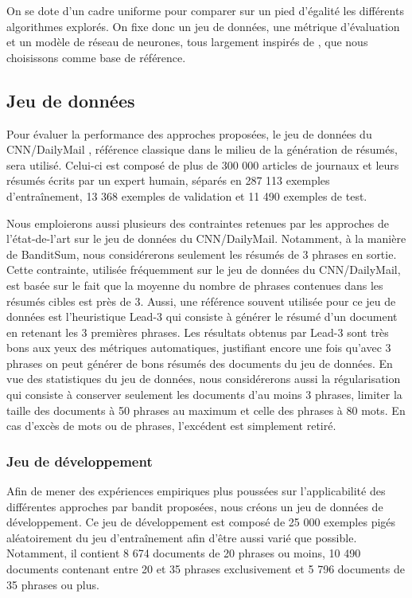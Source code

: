 On se dote d'un cadre uniforme pour comparer sur un pied d'égalité
les différents algorithmes explorés.
On fixe donc un jeu de données, une métrique d'évaluation 
et un modèle de réseau de neurones, tous largement inspirés
de \citet{dong2018banditsum}, que nous choisissons comme base 
de référence.


\subsection{Jeu de données}
\label{subsec:jeu_donnees}

Pour évaluer la performance des approches proposées, le jeu de données du
CNN/DailyMail \citep{hermann2015teaching}, référence classique dans le milieu
de la génération de résumés, sera utilisé.
Celui-ci est composé de plus de 300 000 articles de journaux et
leurs résumés écrits par un expert humain, séparés en 
287 113 exemples d'entraînement, 13 368 exemples de validation 
et 11 490 exemples de test.

Nous emploierons aussi plusieurs des contraintes retenues par les approches
de l'état-de-l'art sur le jeu de données du CNN/DailyMail.
Notamment, à la manière de BanditSum, nous considérerons seulement les résumés
de 3 phrases en sortie.
Cette contrainte, utilisée fréquemment sur le jeu de données du CNN/DailyMail,
est basée sur le fait que la moyenne du nombre de phrases contenues dans les résumés cibles
est près de 3.
Aussi, une référence souvent utilisée pour ce jeu de données est l'heuristique Lead-3 \citep{10.5555/3298483.3298681}
qui consiste à générer le résumé d'un document en retenant les 3 premières phrases.
Les résultats obtenus par Lead-3 sont très bons aux yeux des métriques automatiques,
justifiant encore une fois qu'avec 3 phrases on peut générer de bons résumés des documents du jeu
de données.
En vue des statistiques du jeu de données, nous considérerons aussi la régularisation
qui consiste à conserver seulement les documents d'au moins 3 phrases, limiter la taille des documents à
50 phrases au maximum et celle des phrases à 80 mots.
En cas d'excès de mots ou de phrases, l'excédent est simplement retiré.

\subsubsection*{Jeu de développement}

Afin de mener des expériences empiriques plus poussées sur l'applicabilité
des différentes approches par bandit proposées, nous créons un jeu de données 
de développement.
Ce jeu de développement est composé de 25 000 exemples pigés 
aléatoirement du jeu d'entraînement afin d'être aussi varié que possible.
Notamment, il contient 8 674 documents de 20 phrases ou moins, 10 490
documents contenant entre 20 et 35 phrases exclusivement et 5 796 documents 
de 35 phrases ou plus.

